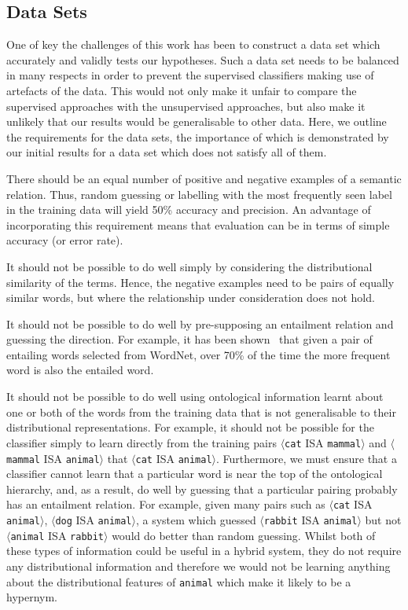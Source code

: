 \documentclass[11pt]{article}
\newcommand\pair[2]{$\langle$\texttt{#1} ISA \texttt{#2}$\rangle$}
\begin{document}
\subsection{Data Sets}
\label{sect:data}

One of key the challenges of this work has been to construct a data set which accurately and validly tests our hypotheses.  Such a data set needs to be balanced in many respects in order to prevent the supervised classifiers making use of artefacts of the data.  This would not only make it unfair to compare the supervised approaches with the unsupervised approaches, but also make it unlikely that our results would be generalisable to other data.  Here, we outline the requirements for the data sets, the importance of which is demonstrated by our initial results for a data set which does not satisfy all of them.

There should be an equal number of positive and negative examples of a semantic relation.  Thus, random guessing or labelling with the most frequently seen label in the training data will yield 50\% accuracy and precision.  An advantage of incorporating this requirement means that evaluation can be in terms of simple accuracy (or error rate).

It should not be possible to do well simply by considering the distributional similarity of the terms.  Hence, the negative examples need to be pairs of equally similar words, but where the relationship under consideration does not hold.

It should not be possible to do well by pre-supposing an entailment relation and guessing the direction.  For example, it has been shown~\cite{Weeds2004} that given a pair of entailing words selected from WordNet, over 70\% of the time the more frequent word is also the entailed word.

It should not be possible to do well using ontological information learnt about one or both of the words from the training data that is not generalisable to their distributional representations.  For example, it should not be possible for the classifier simply to learn directly from the training pairs \pair{cat}{mammal} and \pair{mammal}{animal}  that \pair{cat}{animal}.  Furthermore, we must ensure that a classifier cannot learn that a particular word is near the top of the ontological hierarchy, and, as a result, do well by guessing that a particular pairing probably has an entailment relation.  For example, given many pairs such as \pair{cat}{animal}, \pair{dog}{animal}, a system which guessed \pair{rabbit}{animal} but not \pair{animal}{rabbit} would do better than random guessing.  Whilst both of these types of information could be useful in a hybrid system, they do not require any distributional information and therefore we would not be learning anything about the distributional features of \texttt{animal} which make it likely to be a hypernym.
\end{document}
